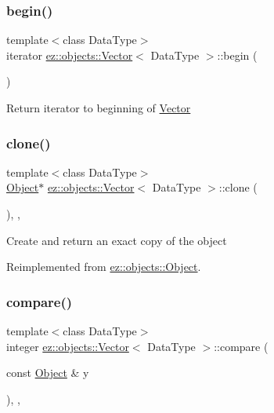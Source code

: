 \subsubsection{\texorpdfstring{begin()}{begin()}}
{\footnotesize\ttfamily template$<$class Data\+Type$>$ \\
iterator \hyperlink{classez_1_1objects_1_1Vector}{ez\+::objects\+::\+Vector}$<$ Data\+Type $>$\+::begin (\begin{DoxyParamCaption}{ }\end{DoxyParamCaption})\hspace{0.3cm}{\ttfamily [inline]}}

Return iterator to beginning of \hyperlink{classez_1_1objects_1_1Vector}{Vector} \mbox{\label{classez_1_1objects_1_1Vector_adc6a4145747c6dfa104cd68d3ced3d35}} 
\subsubsection{\texorpdfstring{clone()}{clone()}}
{\footnotesize\ttfamily template$<$class Data\+Type$>$ \\
\hyperlink{classez_1_1objects_1_1Object}{Object}$\ast$ \hyperlink{classez_1_1objects_1_1Vector}{ez\+::objects\+::\+Vector}$<$ Data\+Type $>$\+::clone (\begin{DoxyParamCaption}{ }\end{DoxyParamCaption})\hspace{0.3cm}{\ttfamily [inline]}, {\ttfamily [override]}, {\ttfamily [virtual]}}

Create and return an exact copy of the object 

Reimplemented from \hyperlink{classez_1_1objects_1_1Object_acf444b2581d898eb4b8c92c2d5865c9e}{ez\+::objects\+::\+Object}.

\mbox{\label{classez_1_1objects_1_1Vector_af4bd9b005b03d1a9e5ec958d96cc24ee}} 
\subsubsection{\texorpdfstring{compare()}{compare()}}
{\footnotesize\ttfamily template$<$class Data\+Type$>$ \\
integer \hyperlink{classez_1_1objects_1_1Vector}{ez\+::objects\+::\+Vector}$<$ Data\+Type $>$\+::compare (\begin{DoxyParamCaption}\item[{const \hyperlink{classez_1_1objects_1_1Object}{Object} \&}]{y }\end{DoxyParamCaption})\hspace{0.3cm}{\ttfamily [inline]}, {\ttfamily [override]}, {\ttfamily [virtual]}}

